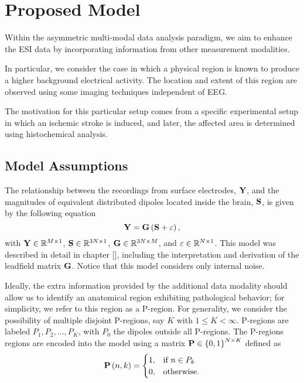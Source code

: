 \chapter{Proposed Model}
%
%
%

Within the asymmetric multi-modal data analysis paradigm, we aim to enhance the ESI data by incorporating information from other measurement modalities.

In particular, we consider the case in which a physical region is known to produce a higher background electrical activity.
%
The location and extent of this region are observed using some imaging techniques independent of EEG.

The motivation for this particular setup comes from a specific experimental setup in which an ischemic stroke is induced, and later, the affected area is determined using histochemical analysis.

\section{Model Assumptions}

The relationship between the recordings from surface electrodes, $\mathbf{Y}$, and the magnitudes of equivalent distributed dipoles located inside the brain, $\mathbf{S}$, is given by the following equation
\begin{equation}
\mathbf{Y} = \mathbf{G} \left( \mathbf{S} + \varepsilon \right),
\label{eq:3.1}
\end{equation}
with $\mathbf{Y} \in \mathbb{R}^{M \times 1}$, $\mathbf{S} \in \mathbb{R}^{3N \times 1}$, $\mathbf{G} \in \mathbb{R}^{3N\times M}$, and $\varepsilon\in \mathbb{R}^{N\times 1}$.
%
This model was described in detail in chapter [], including the interpretation and derivation of the leadfield matrix $\mathbf{G}$.
%
Notice that this model considers only internal noise.

Ideally, the extra information provided by the additional data modality should allow us to identify an anatomical region exhibiting pathological behavior; for simplicity, we refer to this region as a P-region. 
%
For generality, we consider the possibility of multiple disjoint P-regions, say $K$ with $1\leq K < \infty$.
%
P-regions are labeled $P_1, P_2, \dots, P_K$, with $P_0$ the dipoles outside all P-regions.
%
The P-regions regions are encoded into the model using a matrix 
$\mathbf{P}\in \left\{ 0,1 \right\}^{N\times K}$ defined as
\begin{equation}
    \mathbf{P}\left( n,k \right) = \begin{cases}
        1, &\text{if } n \in P_k \\
        0, &\text{otherwise.}
    \end{cases}
\end{equation}

